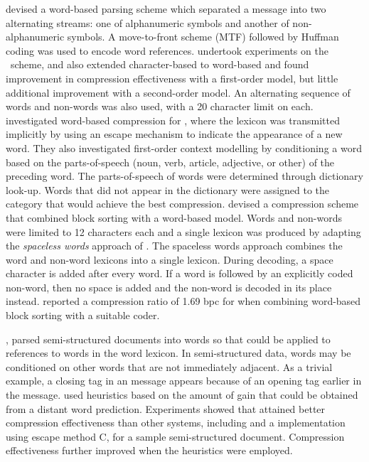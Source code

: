 \citet{bstw86:cacm} devised a word-based parsing scheme which
separated a message into two alternating streams:  one of 
alphanumeric symbols and another of non-alphanumeric symbols.
A move-to-front scheme (MTF) followed by Huffman coding was
used to encode word references.  \citet{moffat89:spe}
undertook experiments on the \citeauthor{bstw86:cacm}\ scheme, 
and also extended character-based \ppm to word-based \ppm
and found improvement in compression effectiveness with a
first-order model, but little additional improvement with a 
second-order model.  An alternating sequence of words and non-words
was also used, with a 20 character limit on each.  \citet{hc92:dcc} 
investigated word-based compression for \lzb, where the 
lexicon was transmitted implicitly by using an escape 
mechanism to indicate the appearance of a new word.  
They also investigated first-order context modelling
by conditioning a word based on the parts-of-speech
(noun, verb, article, adjective, or other) of the
preceding word.  The parts-of-speech of words were
determined through dictionary look-up.  Words that
did not appear in the dictionary were assigned to
the category that would achieve the best compression.
\citet{im01:dcc} devised a compression
scheme that combined block sorting with
a word-based model.  Words and non-words were limited to
12 characters each and a single lexicon was produced
by adapting the {\em {spaceless words}} approach of
\citet{mnzb00:tis}.  The spaceless words approach
combines the word and non-word lexicons into a single
lexicon.  During decoding, a space character is
added after every word.  If a word is followed by an
explicitly coded non-word, then no space is added and
the non-word is decoded in its place instead.  
\citet{im01:dcc} reported a compression ratio of 1.69 bpc
for \wsja when combining word-based block sorting
with a suitable coder.

\citet{nw97:cj}, parsed semi-structured documents 
into words so that 
\sequitur could be applied to references to words in
the word lexicon.  In semi-structured data, words may
be conditioned on other words that are not immediately
adjacent.  As a trivial example, a closing tag in an 
\sgml message appears because of an opening tag earlier
in the message.  \sequitur used heuristics based on the
amount of gain that could be obtained from a distant
word prediction.  Experiments showed that \sequitur attained
better compression effectiveness than other systems, including
\gzip and a \ppm implementation using escape method C, for a
sample semi-structured document.  Compression
effectiveness further improved when the heuristics were 
employed.

